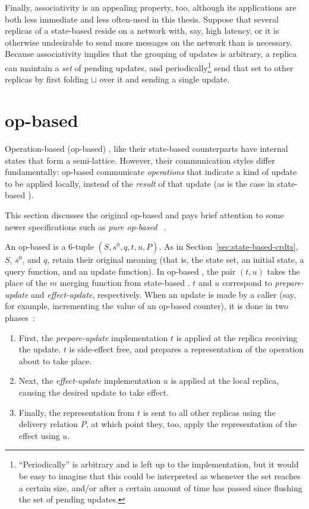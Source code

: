 Finally, associativity is an appealing property, too, although its applications
are both less immediate and less often-used in this thesis. Suppose that several
replicas of a state-based \CRDT reside on a network with, say, high latency, or
it is otherwise undesirable to send more messages on the network than is
necessary. Because associativity implies that the grouping of updates is
arbitrary, a replica can maintain a \textit{set} of pending updates, and
periodically\footnote{``Periodically'' is arbitrary and is left up to the
implementation, but it would be easy to imagine that this could be interpreted
as whenever the set reaches a certain size, and/or after a certain amount of
time has passed since flushing the set of pending updates.} send that set to
other replicas by first folding $\sqcup$ over it and sending a single update.

\section{op-based \CRDTs}
\label{sec:op-based-crdts}

Operation-based (op-based) \CRDTs, like their state-based counterparts have
internal states that form a semi-lattice. However, their communication styles
differ fundamentally: op-based \CRDTs communicate \textit{operations} that
indicate a kind of update to be applied locally, instead of the \textit{result}
of that update (as is the case in state-based \CRDTs).

This section discusses the original op-based \CRDTs and pays brief attention to
some newer specifications such as \textit{pure op-based \CRDTs}~\citep{shapiro11,
baquero17}.

An op-based \CRDT is a $6$-tuple $(S, s^0, q, t, u, P)$. As in
Section~\ref{sec:state-based-crdts}, $S$, $s^0$, and $q$, retain their
original meaning (that is, the state set, an initial state, a query function,
and an update function). In op-based \CRDTs, the pair $(t,u)$ takes the place of
the $m$ merging function from state-based \CRDTs. $t$ and $u$ correspond to
\textit{prepare-update} and \textit{effect-update}, respectively. When an update
is made by a caller (say, for example, incrementing the value of an op-based
\CRDT counter), it is done in two phases~\citep{shapiro11}:
\begin{enumerate}
  \item First, the \textit{prepare-update} implementation $t$ is applied at the
    replica receiving the update. $t$ is side-effect free, and prepares a
    representation of the operation about to take place.
  \item Next, the \textit{effect-update} implementation $u$ is applied at the
    local replica, causing the desired update to take effect.
  \item Finally, the representation from $t$ is sent to all other replicas using
    the delivery relation $P$, at which point they, too, apply the
    representation of the effect using $u$.
\end{enumerate}

